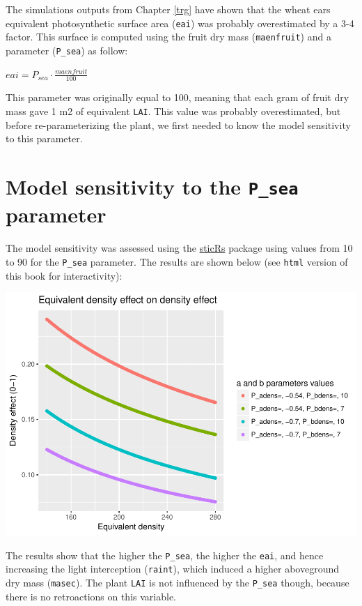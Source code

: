 \documentclass[]{book}
\theoremstyle{definition}
\theoremstyle{definition}
\theoremstyle{definition}
\theoremstyle{remark}
\begin{document}
The simulations outputs from Chapter \ref{trg} have shown that the wheat
ears equivalent photosynthetic surface area (\texttt{eai}) was probably
overestimated by a 3-4 factor. This surface is computed using the fruit
dry mass (\texttt{maenfruit}) and a parameter (\texttt{P\_sea}) as
follow:

\(eai=P_{sea}\cdot\frac{maenfruit}{100}\)

This parameter was originally equal to 100, meaning that each gram of
fruit dry mass gave 1 m2 of equivalent \texttt{LAI}. This value was
probably overestimated, but before re-parameterizing the plant, we first
needed to know the model sensitivity to this parameter.

\section{\texorpdfstring{Model sensitivity to the \texttt{P\_sea}
parameter}{Model sensitivity to the P\_sea parameter}}\label{model-sensitivity-to-the-p_sea-parameter}

The model sensitivity was assessed using the
\href{https://github.com/VEZY/sticRs}{sticRs} package using values from
10 to 90 for the \texttt{P\_sea} parameter. The results are shown below
(see \texttt{html} version of this book for interactivity):

\includegraphics{Postdoc_steps_files/figure-latex/unnamed-chunk-12-1.pdf}

The results show that the higher the \texttt{P\_sea}, the higher the
\texttt{eai}, and hence increasing the light interception
(\texttt{raint}), which induced a higher aboveground dry mass
(\texttt{masec}). The plant \texttt{LAI} is not influenced by the
\texttt{P\_sea} though, because there is no retroactions on this
variable.
\end{document}
